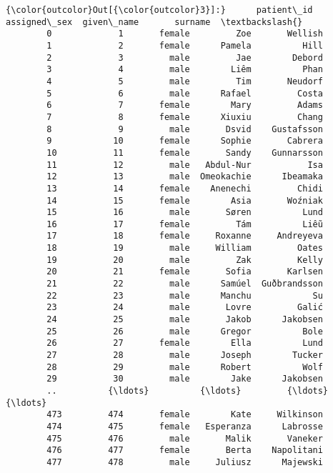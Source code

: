 \documentclass[11pt]{article}
\begin{document}
\begin{Verbatim}[commandchars=\\\{\}]
{\color{outcolor}Out[{\color{outcolor}3}]:}      patient\_id assigned\_sex  given\_name       surname  \textbackslash{}
        0             1       female         Zoe       Wellish   
        1             2       female      Pamela          Hill   
        2             3         male         Jae        Debord   
        3             4         male        Liêm          Phan   
        4             5         male         Tim       Neudorf   
        5             6         male      Rafael         Costa   
        6             7       female        Mary         Adams   
        7             8       female      Xiuxiu         Chang   
        8             9         male       Dsvid    Gustafsson   
        9            10       female      Sophie       Cabrera   
        10           11       female       Sandy    Gunnarsson   
        11           12         male   Abdul-Nur           Isa   
        12           13         male  Omeokachie      Ibeamaka   
        13           14       female    Anenechi         Chidi   
        14           15       female        Asia       Woźniak   
        15           16         male       Søren          Lund   
        16           17       female         Tám          Liễu   
        17           18       female     Roxanne     Andreyeva   
        18           19         male     William         Oates   
        19           20         male         Zak         Kelly   
        20           21       female       Sofia       Karlsen   
        21           22         male      Samúel  Guðbrandsson   
        22           23         male      Manchu            Su   
        23           24         male       Lovre         Galić   
        24           25         male       Jakob      Jakobsen   
        25           26         male      Gregor          Bole   
        26           27       female        Ella          Lund   
        27           28         male      Joseph        Tucker   
        28           29         male      Robert          Wolf   
        29           30         male        Jake      Jakobsen   
        ..          {\ldots}          {\ldots}         {\ldots}           {\ldots}   
        473         474       female        Kate     Wilkinson   
        474         475       female   Esperanza      Labrosse   
        475         476         male       Malik       Vaneker   
        476         477       female       Berta    Napolitani   
        477         478         male     Juliusz      Majewski   

\end{Verbatim}
\end{document}

